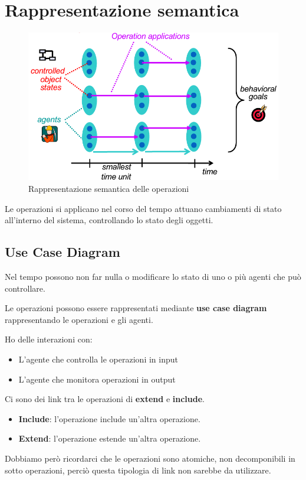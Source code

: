 \section{Rappresentazione semantica}
\begin{figure}[H]
    \centering
    \includegraphics[scale = 0.3]{img/operalizzazione.png}
    \caption{Rappresentazione semantica delle operazioni}
\end{figure}
Le operazioni si applicano nel corso del tempo attuano cambiamenti 
di stato all'interno del sistema, controllando lo stato degli oggetti.
\subsection{Use Case Diagram}
Nel tempo possono non far nulla o modificare lo stato di uno o più agenti 
che può controllare. 

Le operazioni possono essere rappresentati mediante \textbf{use case diagram} rappresentando
le operazioni e gli agenti.

Ho delle interazioni con:
\begin{itemize}
    \item L'agente che controlla le operazioni in input 
    \item L'agente che monitora operazioni in output
\end{itemize}
Ci sono dei link tra le operazioni di \textbf{extend} e \textbf{include}.
\begin{itemize}
    \item \textbf{Include}: l'operazione include un'altra operazione.
    \item \textbf{Extend}: l'operazione estende un'altra operazione.
\end{itemize}
Dobbiamo però ricordarci che le operazioni sono atomiche, non decomponibili in 
sotto operazioni, perciò questa tipologia di link non sarebbe da utilizzare.

